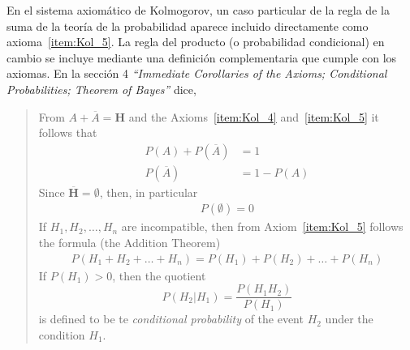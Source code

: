 \documentclass[a4paper,11pt]{book}
\theoremstyle{definition}
\begin{document}
En el sistema axiom\'atico de Kolmogorov, un caso particular de la regla de la suma de la teor\'ia de la probabilidad aparece incluido directamente como axioma~\ref{item:Kol_5}.
%
La regla del producto (o probabilidad condicional) en cambio se incluye mediante una definici\'on complementaria que cumple con los axiomas.
%
En la secci\'on 4 \emph{``Immediate Corollaries of the Axioms; Conditional Probabilities; Theorem of Bayes''} dice,
%
\begin{quotation}
From $A + \overline{A} = \textbf{H}$ and the Axioms~\ref{item:Kol_4} and~\ref{item:Kol_5} it follows that
%
\begin{align}
  P(A) + P(\overline{A}) &= 1 \\
  P(\overline{A}) &= 1-P(A)
\end{align}
%
Since $\overline{\textbf{H}} = \emptyset$, then, in particular
%
\begin{align}
  P(\emptyset) = 0
\end{align}
%
If $H_1, H_2, \dots, H_n$ are incompatible, then from Axiom~\ref{item:Kol_5} follows the formula (the Addition Theorem)
%
\begin{align} \label{eq:sum_rule_kolmogorov}
  P(H_1 + H_2 + \dots + H_n) = P(H_1) + P(H_2) + \dots + P(H_n)
\end{align}
%
If $P(H_1) > 0$, then the quotient
%
\begin{equation} \label{eq:conditional_probability_kolmogorov}
  P(H_2|H_1) = \frac{P(H_1H_2)}{P(H_1)}
\end{equation}
%
is defined to be te \emph{conditional probability} of the event $H_2$ under the condition $H_1$.



\end{quotation}
\end{document}
